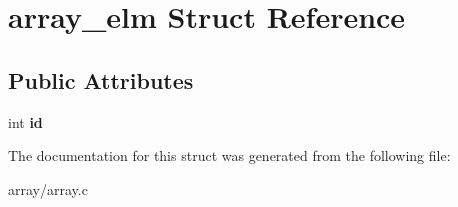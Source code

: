 \hypertarget{structarray__elm}{}\section{array\+\_\+elm Struct Reference}
\label{structarray__elm}
\subsection*{Public Attributes}
\begin{DoxyCompactItemize}
\item 
\mbox{\label{structarray__elm_a2b4f75b5ca99d2c6fea1793585395094}} 
int {\bfseries id}
\end{DoxyCompactItemize}


The documentation for this struct was generated from the following file\+:\begin{DoxyCompactItemize}
\item 
array/array.\+c\end{DoxyCompactItemize}
